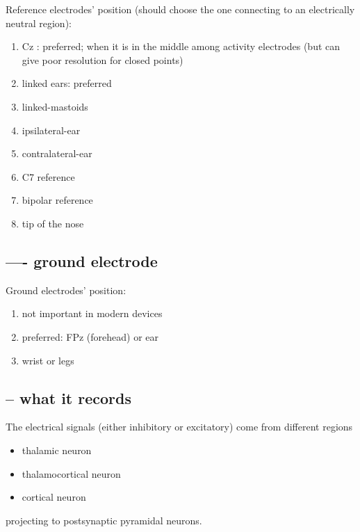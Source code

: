 Reference electrodes' position (should choose the one connecting to an
electrically neutral region):
\begin{enumerate}
  \item Cz : preferred; when it is in the middle among activity electrodes (but
  can give poor resolution for closed points)
  
  \item linked ears: preferred
  
  \item linked-mastoids
  
  \item ipsilateral-ear
  
  \item contralateral-ear
  
  \item C7 reference
  
  \item bipolar reference
  
  \item tip of the nose
\end{enumerate}

\subsection{---- ground electrode}
\label{sec:ground-electrode}
\label{sec:EEG-ground-electrode}

Ground electrodes' position:
\begin{enumerate}
  \item  not important in modern devices
  
  \item preferred: FPz (forehead) or ear 
  
  \item wrist or legs
\end{enumerate}


\subsection{-- what it records}
\label{sec:EEG-signal-meaning}

The electrical signals (either inhibitory or excitatory) come from different
regions
\begin{itemize}
  \item thalamic neuron
  \item thalamocortical neuron
  \item cortical neuron
\end{itemize}
projecting to postsynaptic pyramidal neurons.

